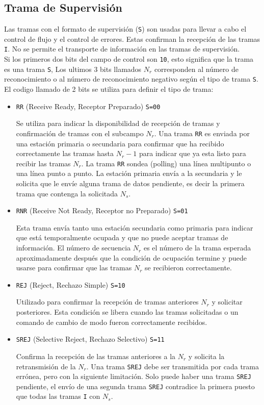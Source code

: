 \subsection*{Trama de Supervisión}
Las tramas con el formato de supervisión (\texttt{S}) son usadas para llevar a cabo el control de flujo y el control de errores. Estas confirman la recepción de las tramas \texttt{I}. No se permite el transporte de información en las tramas de supervisión.
\\${ }$\\
Si los primeros dos bits del campo de control son \texttt{10}, esto significa que la trama es una trama \texttt{S}, Los ultimos 3 bits llamados $N_r$ corresponden al número de reconocimiento o al número de reconocimiento negativo según el tipo de trama \texttt{S}. El codigo llamado de 2 bits se utiliza para definir el tipo de trama:
\begin{itemize}
\item \texttt{RR} (Receive Ready, Receptor Preparado) \texttt{S=00} 

Se utiliza para indicar la disponibilidad de recepción de tramas y confirmación de tramas con el subcampo $N_r$. Una trama \texttt{RR} es enviada por una estación primaria o secundaria para confirmar que ha recibido correctamente las tramas hasta $N_r -1$ para indicar que ya esta listo para recibir las tramas $N_r$. La trama \texttt{RR} sondea (polling) una línea multipunto o una línea punto a punto. La estación primaria envía a la secundaria y le solicita que le envíe alguna trama de datos pendiente, es decir la primera trama que contenga la solicitada $N_s$.

\item \texttt{RNR} (Receive Not Ready, Receptor no Preparado) \texttt{S=01} 

Esta trama envía tanto una estación secundaria como primaria para indicar que está temporalmente ocupada y que no puede aceptar tramas de información. El número de secuencia $N_r$ es el número de la trama esperada aproximadamente después que la condición de ocupación termine y puede usarse para confirmar que las tramas $N_r$ se recibieron correctamente.

\item \texttt{REJ} (Reject, Rechazo Simple) \texttt{S=10} 

Utilizado para confirmar la recepción de tramas anteriores $N_r$ y solicitar posteriores. Esta condición se libera cuando las tramas solicitadas o un comando de cambio de modo fueron correctamente recibidos.

\item \texttt{SREJ} (Selective Reject, Rechazo Selectivo) \texttt{S=11} 

Confirma la recepción de las tramas anteriores a la $N_r$ y solicita la retransmisión de la $N_r$. Una trama \texttt{SREJ} debe ser transmitida por cada trama errónea, pero con la siguiente limitación. Solo puede haber una trama \texttt{SREJ} pendiente, el envío de una segunda trama \texttt{SREJ} contradice la primera puesto que todas las tramas \texttt{I} con $N_s$.

\end{itemize}

